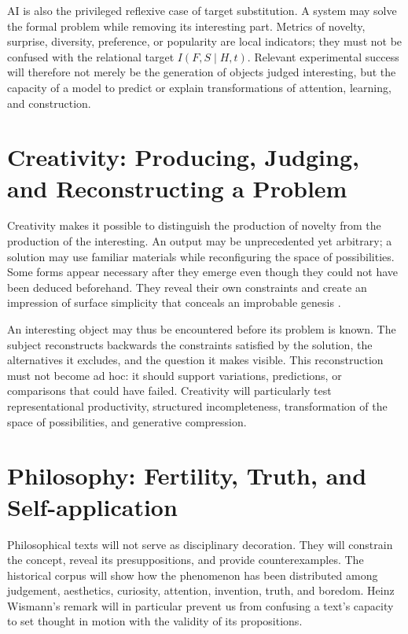 \documentclass[11pt,a4paper]{article}
\begin{document}
AI is also the privileged reflexive case of target substitution. A
system may solve the formal problem while removing its interesting part.
Metrics of novelty, surprise, diversity, preference, or popularity are local
indicators; they must not be confused with the relational target
\(I(F,S\mid H,t)\). Relevant experimental success will therefore not merely be
the generation of objects judged interesting, but the capacity of a model to
predict or explain transformations of attention, learning, and construction.

\section{Creativity: Producing, Judging, and Reconstructing a Problem}

Creativity makes it possible to distinguish the production of novelty from the
production of the interesting. An output may be unprecedented yet arbitrary; a
solution may use familiar materials while reconfiguring the space of
possibilities. Some forms appear necessary after they emerge even though they
could not have been deduced beforehand. They reveal their own constraints and
create an impression of surface simplicity that conceals an improbable genesis
\parencite{pachet2026impossibilite,pachet2027virtuosite}.

An interesting object may thus be encountered before its problem is known. The
subject reconstructs backwards the constraints satisfied by the solution, the
alternatives it excludes, and the question it makes visible. This reconstruction
must not become ad hoc: it should support variations, predictions, or
comparisons that could have failed. Creativity will particularly test
representational productivity, structured incompleteness, transformation of the
space of possibilities, and generative compression.

\section{Philosophy: Fertility, Truth, and Self-application}

Philosophical texts will not serve as disciplinary decoration. They will
constrain the concept, reveal its presuppositions, and provide counterexamples.
The historical corpus will show how the phenomenon has been distributed among
judgement, aesthetics, curiosity, attention, invention, truth, and boredom.
Heinz Wismann's remark will in particular prevent us from confusing a text's
capacity to set thought in motion with the validity of its propositions.
\end{document}
